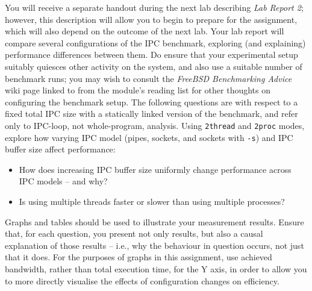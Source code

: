 \documentclass[a4paper,10pt]{article}
\begin{document}
You will receive a separate handout during the next lab describing \textit{Lab
Report 2}; however, this description will allow you to begin to prepare for
the assignment, which will also depend on the outcome of the next lab.
Your lab report will compare several configurations of the IPC benchmark,
exploring (and explaining) performance differences between them.
Do ensure that your experimental setup suitably quiesces other activity on the
system, and also use a suitable number of benchmark runs; you may wish to
consult the \textit{FreeBSD Benchmarking Advice} wiki page linked to from the
module's reading list for other thoughts on configuring the benchmark setup.
The following questions are with respect to a fixed total IPC size with a
statically linked version of the benchmark, and refer only to IPC-loop, not
whole-program, analysis.
Using \texttt{2thread} and \texttt{2proc} modes, explore how varying IPC model
(pipes, sockets, and sockets with \texttt{-s}) and IPC buffer size affect
performance:

\begin{itemize}
  \item How does increasing IPC buffer size uniformly change performance
    across IPC models -- and why?
  \item Is using multiple threads faster or slower than using multiple
    processes?
\end{itemize}

\noindent
Graphs and tables should be used to illustrate your measurement results.
Ensure that, for each question, you present not only results, but also a
causal explanation of those results -- i.e., why the behaviour in question
occurs, not just that it does.
For the purposes of graphs in this assignment, use achieved bandwidth, rather
than total execution time, for the Y axis, in order to allow you to more
directly visualise the effects of configuration changes on efficiency.
\end{document}
